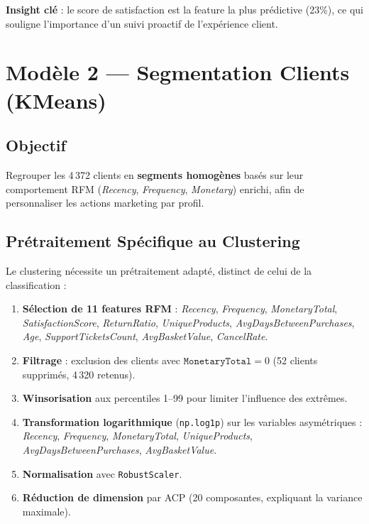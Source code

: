 \documentclass[12pt,a4paper]{article}
\begin{document}
\textbf{Insight clé} : le score de satisfaction est la feature la plus prédictive (23\%),
ce qui souligne l'importance d'un suivi proactif de l'expérience client.

\section{Modèle 2 — Segmentation Clients (KMeans)}

\subsection{Objectif}

Regrouper les 4\,372 clients en \textbf{segments homogènes} basés sur leur comportement
RFM (\textit{Recency}, \textit{Frequency}, \textit{Monetary}) enrichi, afin de personnaliser
les actions marketing par profil.

\subsection{Prétraitement Spécifique au Clustering}

Le clustering nécessite un prétraitement adapté, distinct de celui de la classification :

\begin{enumerate}
  \item \textbf{Sélection de 11 features RFM} : \textit{Recency}, \textit{Frequency},
        \textit{MonetaryTotal}, \textit{SatisfactionScore}, \textit{ReturnRatio},
        \textit{UniqueProducts}, \textit{AvgDaysBetweenPurchases}, \textit{Age},
        \textit{SupportTicketsCount}, \textit{AvgBasketValue}, \textit{CancelRate}.
  \item \textbf{Filtrage} : exclusion des clients avec $\texttt{MonetaryTotal} = 0$
        (52 clients supprimés, 4\,320 retenus).
  \item \textbf{Winsorisation} aux percentiles 1--99 pour limiter l'influence des extrêmes.
  \item \textbf{Transformation logarithmique} (\texttt{np.log1p}) sur les variables asymétriques :
        \textit{Recency}, \textit{Frequency}, \textit{MonetaryTotal}, \textit{UniqueProducts},
        \textit{AvgDaysBetweenPurchases}, \textit{AvgBasketValue}.
  \item \textbf{Normalisation} avec \texttt{RobustScaler}.
  \item \textbf{Réduction de dimension} par ACP (20 composantes, expliquant la variance maximale).
\end{enumerate}
\end{document}
